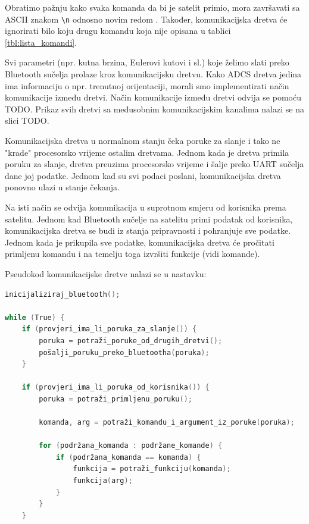 \documentclass[times, utf8, diplomski, numeric]{templates/template}
\begin{document}
{{{{                Obratimo pažnju kako svaka komanda da bi je satelit primio, mora završavati sa ASCII znakom \texttt{\textbackslash n} odnosno novim redom . Također, komunikacijska dretva će ignorirati bilo koju drugu komandu koja nije opisana u tablici \ref{tbl:lista_komandi}.

                Svi parametri (npr. kutna brzina, Eulerovi kutovi i sl.) koje želimo slati preko Bluetooth sučelja prolaze kroz komunikacijsku dretvu. Kako ADCS dretva jedina ima informaciju o npr. trenutnoj orijentaciji, morali smo implementirati način komunikacije između dretvi. Način komunikacije između dretvi odvija se pomoću TODO. Prikaz svih dretvi sa međusobnim komunikacijskim kanalima nalazi se na slici TODO. 
                
                Komunikacijska dretva u normalnom stanju čeka poruke za slanje i tako ne "krade" procesorsko vrijeme ostalim dretvama. Jednom kada je dretva primila poruku za slanje, dretva preuzima procesorsko vrijeme i šalje preko UART sučelja dane joj podatke. Jednom kad su svi podaci poslani, komunikacijska dretva ponovno ulazi u stanje čekanja.
                
                Na isti način se odvija komunikacija u suprotnom smjeru od korisnika prema satelitu. Jednom kad Bluetooth sučelje na satelitu primi podatak od korisnika, komunikacijska dretva se budi iz stanja pripravnosti i pohranjuje sve podatke. Jednom kada je prikupila sve podatke, komunikacijska dretva će pročitati primljenu komandu i na temelju toga izvršiti funkcije (vidi komande).

                Pseudokod komunikacijske dretve nalazi se u nastavku:

                \begin{lstlisting}[language=C]
inicijaliziraj_bluetooth();

while (True) {
    if (provjeri_ima_li_poruka_za_slanje()) {
        poruka = potraži_poruke_od_drugih_dretvi();
        pošalji_poruku_preko_bluetootha(poruka);
    }

    if (provjeri_ima_li_poruka_od_korisnika()) {
        poruka = potraži_primljenu_poruku();

        komanda, arg = potraži_komandu_i_argument_iz_poruke(poruka);

        for (podržana_komanda : podržane_komande) {
            if (podržana_komanda == komanda) {
                funkcija = potraži_funkciju(komanda);
                funkcija(arg);
            }
        }
    }


\end{lstlisting}}}}}
\end{document}
